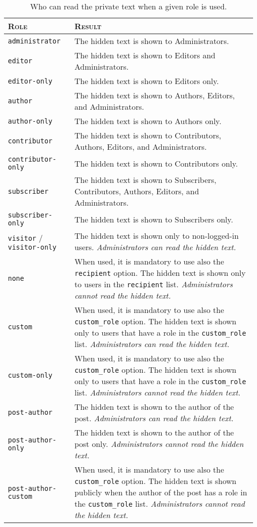 \begin{table}
 \centering
 \begin{tabular}[t]{l p{7cm}}
 \toprule
 \textsc{Role} & \textsc{Result} \\
 \midrule
 \verb+administrator+ & The hidden text is shown to Administrators. \\
 \verb+editor+ & The hidden text is shown to Editors and Administrators. \\
 \verb+editor-only+ & The hidden text is shown to Editors only. \\
 \verb+author+ & The hidden text is shown to Authors, Editors, and
 Administrators. \\
 \verb+author-only+ & The hidden text is shown to Authors only. \\
 \verb+contributor+ & The hidden text is shown to Contributors, Authors,
 Editors, and Administrators. \\
 \verb+contributor-only+ & The hidden text is shown to Contributors only. \\
 \verb+subscriber+ & The hidden text is shown to Subscribers, Contributors,
 Authors, Editors, and Administrators. \\
 \verb+subscriber-only+ & The hidden text is shown to Subscribers only. \\
 \verb+visitor+ / \verb+visitor-only+ & The hidden text is shown only to
 non-logged-in users. \textit{Administrators can read the hidden text.} \\
 \verb+none+ & When used, it is mandatory to use also the \verb+recipient+
 option. The hidden text is shown only to users in the \verb+recipient+ list.
 \textit{Administrators cannot read the hidden text.} \\
 \verb+custom+ & When used, it is mandatory to use also the \verb+custom_role+
 option. The hidden text is shown only to users that have a role in the
 \verb+custom_role+ list. \textit{Administrators can read the hidden text.} \\
 \verb+custom-only+ & When used, it is mandatory to use also the
 \verb+custom_role+ option. The hidden text is shown only to users that have a
 role in the \verb+custom_role+ list. \textit{Administrators cannot read the
 hidden text.} \\
 \verb+post-author+ & The hidden text is shown to the author of the post.
 \textit{Administrators can read the hidden text.} \\
 \verb+post-author-only+ & The hidden text is shown to the author of the post
 only. \textit{Administrators cannot read the hidden text.} \\
 \verb+post-author-custom+ & When used, it is mandatory to use also the
 \verb+custom_role+ option. The hidden text is shown publicly when the author of
 the post has a role in the \verb+custom_role+ list. \textit{Administrators
 cannot read the hidden text.} \\
 \bottomrule
 \end{tabular}
 \caption{Who can read the private text when a given role is used.}
 \label{table:roles}
\end{table}

